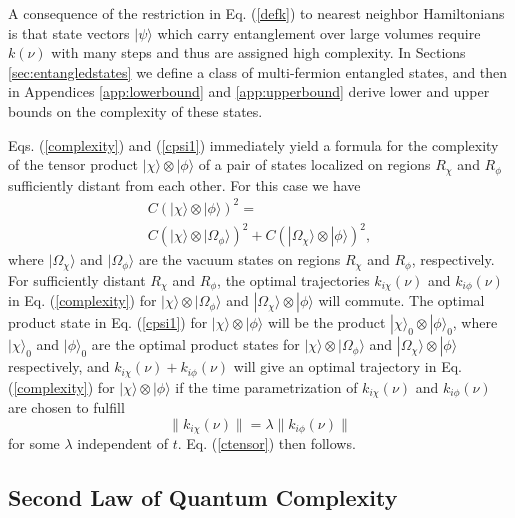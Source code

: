 \documentclass[twocolumn,amsmath,amssymb]{revtex4-1}
\begin{document}
A consequence of the restriction in Eq. (\ref{defk}) to nearest neighbor Hamiltonians is
that state vectors $|\psi \rangle $ which carry entanglement over large volumes
require $k(\nu)$ with many steps and thus
are assigned high complexity.  
In Sections \ref{sec:entangledstates} we define a class of 
multi-fermion entangled states, and then in
Appendices \ref{app:lowerbound} and \ref{app:upperbound} 
derive lower and upper bounds on the complexity of these states.

Eqs. (\ref{complexity}) and (\ref{cpsi1}) immediately yield 
a formula for the complexity of the tensor product $|\chi \rangle  \otimes |\phi \rangle $ of a pair of states
localized on regions $R_{\chi}$ and $R_{\phi}$ sufficiently distant from each other. 
For this case we have
\begin{multline}
\label{ctensor}
C( |\chi \rangle  \otimes |\phi \rangle )^2 = \\
C( |\chi \rangle  \otimes |\Omega_{\phi} \rangle  )^2 + C( |\Omega_{\chi} \rangle  \otimes |\phi \rangle )^2,
\end{multline}
where $|\Omega_{\chi} \rangle $ and $|\Omega_{\phi} \rangle $ are the vacuum states on regions $R_{\chi}$
and $R_{\phi}$, respectively. For sufficiently 
distant $R_{\chi}$ and $R_{\phi}$, the optimal trajectories 
$k_{i\chi}(\nu)$ and $k_{i\phi}(\nu)$
in Eq. (\ref{complexity})
for  $|\chi \rangle  \otimes |\Omega_{\phi} \rangle $ and $|\Omega_{\chi} \rangle  \otimes |\phi \rangle $
will commute. The optimal product state in 
Eq. (\ref{cpsi1}) for $|\chi \rangle  \otimes |\phi \rangle $ will be the product
$|\chi \rangle _0 \otimes |\phi \rangle _0$, where $|\chi \rangle _0$ and $|\phi \rangle _0$
are the optimal product states for $|\chi \rangle  \otimes |\Omega_{\phi} \rangle $ and $|\Omega_{\chi} \rangle  \otimes |\phi \rangle $
respectively, and
$k_{i\chi}(\nu) + k_{i\phi}(\nu)$ will give
an optimal trajectory in Eq. (\ref{complexity}) for $|\chi \rangle  \otimes |\phi \rangle $ if the
time parametrization of 
$k_{i\chi}(\nu)$ and $k_{i\phi}(\nu)$ are chosen to fulfill
\begin{equation}
\label{fixedratio}
\parallel k_{i\chi}(\nu)\parallel = \lambda \parallel k_{i\phi}(\nu)\parallel
\end{equation}
for some $\lambda$ independent of $t$.
Eq. (\ref{ctensor}) then follows.


\subsection{\label{subsec:secondlaw} Second Law of Quantum Complexity}
\end{document}
